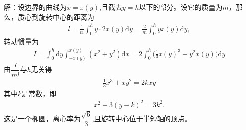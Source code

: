 \begin{enumerate}
    解：设边界的曲线为$x=x(y)$,且截去$y=h$以下的部分。设它的质量为$m$，那么，质心到旋转中心的距离为
    \begin{align*}
        l=\frac{1}{m}\int_0^hy\cdot 2x(y)\text{d}y=\frac{2}{m}\int_0^hyx(y)\text{d}y,
    \end{align*}
    转动惯量为
    \begin{align*}
        I=\int_0^h\text{d}y\int_{-x(y)}^{x(y)}(x^2+y^2)\text{d}x=2\int_0^h\Big(\frac{1}{3}x(y)^3+y^2x(y)\Big)\text{d}y
    \end{align*}
    由$\dfrac{I}{ml}$与$h$无关得
    \begin{align*}
        \frac{1}{3}x^3+xy^2=2kxy
    \end{align*}
    其中$k$是常数，即
    \begin{align*}
        x^2+3(y-k)^2=3k^2.
    \end{align*}
    这是一个椭圆，离心率为$\dfrac{\sqrt{6}}{3}$,且旋转中心位于半短轴的顶点。
\end{enumerate}



